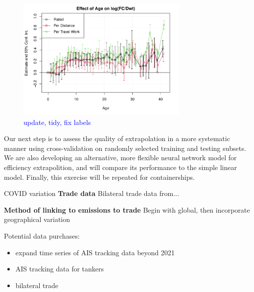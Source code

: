 \documentclass[hidelinks, 12pt,letterpaper]{article}
\begin{document}
\begin{figure}[h]
  \centering
  \includegraphics[width = 0.75\textwidth]{Efficiency_Regression_Size_Age_Coeffs_3.pdf}
  \caption{\textcolor{blue}{update, tidy, fix labels}}
  \label{fig:efficiency}
\end{figure}

Our next step is to assess the quality of extrapolation in a more systematic manner using cross-validation on randomly selected training and testing subsets. We are also developing an alternative, more flexible neural network model for efficiency extrapolition, and will compare its performance to the simple linear model. Finally, this exercise will be repeated for containerships.

COVID variation
\textbf{Trade data} Bilateral trade data from...

\textbf{Method of linking to emissions to trade}
Begin with global, then incorporate geographical variation


\pagebreak
Potential data purchases:
\begin{itemize}
  \item expand time series of AIS tracking data beyond 2021
  \item AIS tracking data for tankers
  \item bilateral trade
\end{itemize}

\pagebreak
  
\singlespace{

}

 
\end{document}
